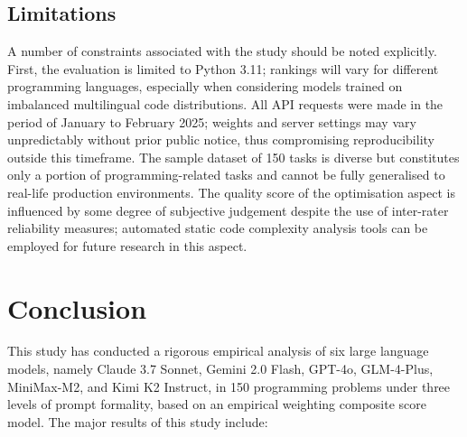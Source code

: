 \documentclass[conference]{IEEEtran}
\begin{document}
\subsection{Limitations}

A number of constraints associated with the study should be noted explicitly. First, the evaluation is limited to Python 3.11; rankings will vary for different programming languages, especially when considering models trained on imbalanced multilingual code distributions. All API requests were made in the period of January to February 2025; weights and server settings may vary unpredictably without prior public notice, thus compromising reproducibility outside this timeframe. The sample dataset of 150 tasks is diverse but constitutes only a portion of programming-related tasks and cannot be fully generalised to real-life production environments. The quality score of the optimisation aspect is influenced by some degree of subjective judgement despite the use of inter-rater reliability measures; automated static code complexity analysis tools can be employed for future research in this aspect.

\section{Conclusion}
\label{sec:conclusion}

This study has conducted a rigorous empirical analysis of six large language models, namely Claude 3.7 Sonnet, Gemini 2.0 Flash, GPT-4o, GLM-4-Plus, MiniMax-M2, and Kimi K2 Instruct, in 150 programming problems under three levels of prompt formality, based on an empirical weighting composite score model. The major results of this study include:
\end{document}
